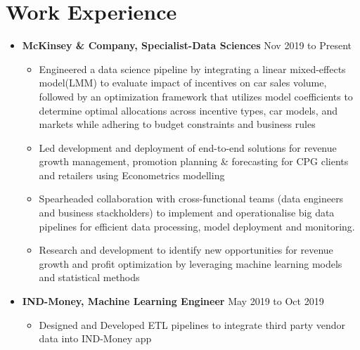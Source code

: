 \documentclass[a4paper,10pt]{article}
\begin{document}
\section*{Work Experience}
\begin{itemize}[leftmargin=0.2cm, label={}]
    \item \textbf{McKinsey \& Company, Specialist-Data Sciences} \hfill \textnormal{Nov 2019 to Present}
    \begin{itemize}[leftmargin=0.5cm, label={\textbullet}]
        \item Engineered a data science pipeline by integrating a linear mixed-effects model(LMM) to evaluate impact of incentives on car sales volume, followed by an optimization framework that utilizes model coefficients to determine optimal allocations across incentive types, car models, and markets while adhering to budget constraints and business rules
        \item Led development and deployment of end-to-end solutions for revenue growth management, promotion planning \& forecasting for CPG clients and retailers using Econometrics modelling
        \item Spearheaded collaboration with cross-functional teams (data engineers and business stackholders) to implement and operationalise big data pipelines for efficient data processing, model deployment and monitoring.
        \item Research and development to identify new opportunities for revenue growth and profit optimization by leveraging machine learning models and statistical methods
    \end{itemize}
    
    \item \textbf{IND-Money, Machine Learning Engineer} \hfill \textnormal{May 2019 to Oct 2019}
    \begin{itemize}[leftmargin=0.5cm, label={\textbullet}]
        \item Designed and Developed ETL pipelines to integrate third party vendor data into IND-Money app
    \end{itemize}


\end{itemize}
\end{document}

